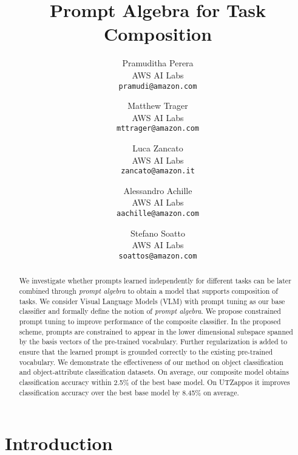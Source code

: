 \documentclass[10pt,twocolumn,letterpaper]{article}
\begin{document}
\title{Prompt Algebra for Task Composition }

\author{Pramuditha Perera\\
AWS AI Labs\\
{\tt\small pramudi@amazon.com}
\and
Matthew Trager\\
AWS AI Labs\\
{\tt\small mttrager@amazon.com}
\and
Luca Zancato\\
AWS AI Labs\\
{\tt\small zancato@amazon.it}
\and
Alessandro Achille\\
AWS AI Labs\\
{\tt\small aachille@amazon.com}
\and
Stefano Soatto\\
AWS AI Labs\\
{\tt\small soattos@amazon.com}
}
\maketitle

\begin{abstract}
We investigate whether prompts learned independently for different tasks can be later combined through  \textit{prompt algebra} to obtain a model that supports composition of tasks.  We consider Visual Language Models (VLM) with prompt tuning as our base classifier and formally define the notion of \textit{prompt algebra}.  We propose constrained prompt tuning to improve performance of the composite classifier. In the proposed scheme, prompts are constrained to appear in the lower dimensional subspace spanned by the basis vectors of the pre-trained vocabulary. Further regularization is added to ensure that the learned prompt is grounded correctly to the existing pre-trained vocabulary. We demonstrate the effectiveness of our method on object classification and object-attribute classification datasets. On average, our composite model obtains classification accuracy within 2.5\% of the best base model. On UTZappos it improves classification accuracy over the best base model by 8.45\% on average.
\end{abstract}

\section{Introduction}
\label{sec:intro}
\end{document}

